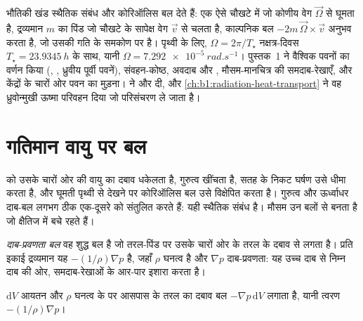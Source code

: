 \begin{recall}
भौतिकी खंड स्थैतिक संबंध और कोरिऑलिस बल देते हैं: एक ऐसे चौखटे में जो कोणीय वेग $\vec\Omega$ से घूमता है, द्रव्यमान $m$ का पिंड जो चौखटे के सापेक्ष वेग $\vec v$ से चलता है, काल्पनिक बल
$-2m\,\vec\Omega\times\vec v$ अनुभव करता है, जो उसकी गति के समकोण पर है। पृथ्वी के लिए, $\Omega = 2\pi/T_\star$ नक्षत्र-दिवस $T_\star = \qty{23.9345}{h}$ के साथ, यानी
$\Omega = \qty{7.292e-5}{rad.s^{-1}}$। पुस्तक~1 ने वैश्विक पवनों का वर्णन किया (, , ध्रुवीय पूर्वी पवनें), संवहन-कोष्ठ, अवदाब और , मौसम-मानचित्र की समदाब-रेखाएँ, और केंद्रों के चारों ओर पवन का मुड़ना।  ने  और  दी, और \cref{ch:b1:radiation-heat-transport} ने वह ध्रुवोन्मुखी ऊष्मा परिवहन दिया जो परिसंचरण ले जाता है।
\end{recall}

\section{गतिमान वायु पर बल}\label{sec:b1:atmospheric-circulation:forces}

 को उसके चारों ओर की वायु का दबाव धकेलता है, गुरुत्व खींचता है, सतह के निकट घर्षण उसे धीमा करता है, और घूमती पृथ्वी से देखने पर कोरिऑलिस बल उसे विक्षेपित करता है। गुरुत्व और ऊर्ध्वाधर दाब-बल लगभग ठीक एक-दूसरे को संतुलित करते हैं: यही स्थैतिक संबंध है। मौसम उन बलों से बनता है जो क्षैतिज में बचे रहते हैं।

\begin{definition}[दाब-प्रवणता बल]\label{def:b1:atmospheric-circulation:pgf}
\emph{दाब-प्रवणता बल} वह शुद्ध बल है जो तरल-पिंड पर उसके चारों ओर के तरल के दबाव से लगता है। प्रति इकाई द्रव्यमान यह $-(1/\rho)\nabla p$ है, जहाँ $\rho$ घनत्व है और $\nabla p$ दाब-प्रवणता: यह उच्च दाब से निम्न दाब की ओर, समदाब-रेखाओं के आर-पार इशारा करता है।
\end{definition}

\begin{proposition}[दाब-प्रवणता बल]\label{prop:b1:atmospheric-circulation:pgf}
$\mathrm dV$ आयतन और $\rho$ घनत्व के  पर आसपास के तरल का दबाव बल $-\nabla p\,\mathrm dV$ लगाता है, यानी त्वरण $-(1/\rho)\nabla p$।
\end{proposition}

